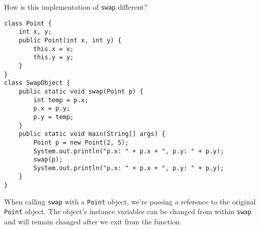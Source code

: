 \question How is this implementation of \texttt{swap} different?

\begin{lstlisting}
class Point {
    int x, y;
    public Point(int x, int y) {
        this.x = x;
        this.y = y;
    }
}
class SwapObject {
    public static void swap(Point p) {
        int temp = p.x;
        p.x = p.y;
        p.y = temp;
    }
    public static void main(String[] args) {
        Point p = new Point(2, 5);
        System.out.println("p.x: " + p.x + ", p.y: " + p.y);
        swap(p);
        System.out.println("p.x: " + p.x + ", p.y: " + p.y);
    }
}
\end{lstlisting}

\begin{solution}[1em]
When calling \texttt{swap} with a \texttt{Point} object, we're passing a reference to the original \texttt{Point} object. The object's instance variables can be changed from within \texttt{swap} and will remain changed after we exit from the function.
\end{solution}